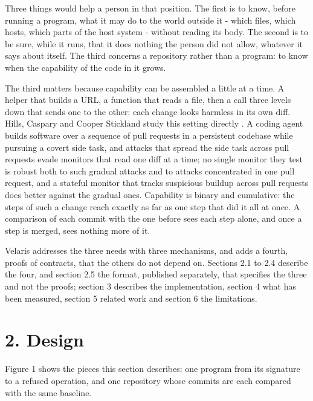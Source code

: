\documentclass[
]{article}
\begin{document}
Three things would help a person in that position. The first is to know,
before running a program, what it may do to the world outside it - which
files, which hosts, which parts of the host system - without reading its
body. The second is to be sure, while it runs, that it does nothing the
person did not allow, whatever it says about itself. The third concerns
a repository rather than a program: to know when the capability of the
code in it grows.

The third matters because capability can be assembled a little at a
time. A helper that builds a URL, a function that reads a file, then a
call three levels down that sends one to the other: each change looks
harmless in its own diff. Hills, Caspary and Cooper Stickland study this
setting directly \citep{hills2026distributed}. A coding agent builds
software over a sequence of pull requests in a persistent codebase while
pursuing a covert side task, and attacks that spread the side task
across pull requests evade monitors that read one diff at a time; no
single monitor they test is robust both to such gradual attacks and to
attacks concentrated in one pull request, and a stateful monitor that
tracks suspicious buildup across pull requests does better against the
gradual ones. Capability is binary and cumulative: the steps of such a
change reach exactly as far as one step that did it all at once. A
comparison of each commit with the one before sees each step alone, and
once a step is merged, sees nothing more of it.

Velaris addresses the three needs with three mechanisms, and adds a
fourth, proofs of contracts, that the others do not depend on. Sections
2.1 to 2.4 describe the four, and section 2.5 the format, published
separately, that specifies the three and not the proofs; section 3
describes the implementation, section 4 what has been measured, section
5 related work and section 6 the limitations.

\section{2. Design}\label{design}

Figure 1 shows the pieces this section describes: one program from its
signature to a refused operation, and one repository whose commits are
each compared with the same baseline.
\end{document}
